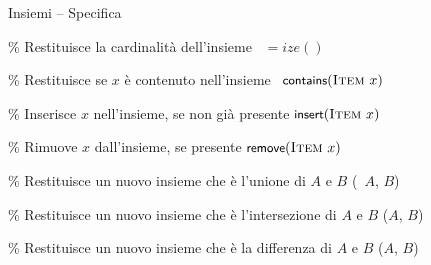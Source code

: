 \begin{frame}[shrink=12]{Insiemi -- Specifica}

\vspace{-12pt}
\begin{Procedure}
\caption{\Set}

\% Restituisce la cardinalità dell'insieme\;
\alert{\INTEGER\ $=ize()$}
\BlankLine

\% Restituisce \TRUE se $x$ è contenuto nell'insieme\;
\alert{\BOOLEAN\ $\textsf{{\small contains}}(\textsc{Item}\ x)$}
\BlankLine

\% Inserisce $x$ nell'insieme, se non già presente\;
\alert{$\textsf{{\small insert}}(\textsc{Item}\ x)$}
\BlankLine

\% Rimuove $x$ dall'insieme, se presente\;
\alert{$\textsf{{\small remove}}(\textsc{Item}\ x)$}
\BlankLine

\% Restituisce un nuovo insieme che è l'unione di $A$ e $B$\;
\alert{\Set \setunion(\Set\ $A$, \Set $B$)}
\BlankLine

\% Restituisce un nuovo insieme che è l'intersezione di $A$ e $B$\;
\alert{\Set \setintersection(\Set $A$, \Set $B$)}
\BlankLine

\% Restituisce un nuovo insieme che è la differenza di $A$ e $B$\;
\alert{\Set \setdifference(\Set $A$, \Set $B$)}
\end{Procedure}
  
\end{frame}

